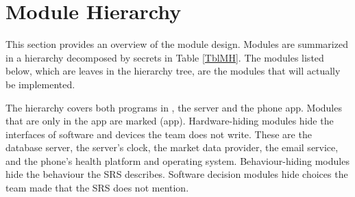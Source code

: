 \documentclass[12pt, titlepage]{article}
\newcounter{ucnum}
\newcommand{\uctheucnum}{UC\theucnum}
\begin{document}

\section{Module Hierarchy} \label{SecMH}

This section provides an overview of the module design. Modules are summarized
in a hierarchy decomposed by secrets in Table \ref{TblMH}. The modules listed
below, which are leaves in the hierarchy tree, are the modules that will
actually be implemented.

The hierarchy covers both programs in \progname{}, the server and the phone
app. Modules that are only in the app are marked (app). Hardware-hiding modules
hide the interfaces of software and devices the team does not write. These are
the database server, the server's clock, the market data provider, the email
service, and the phone's health platform and operating system. Behaviour-hiding modules hide the
behaviour the SRS describes. Software decision modules hide choices the team
made that the SRS does not mention.
\end{document}
